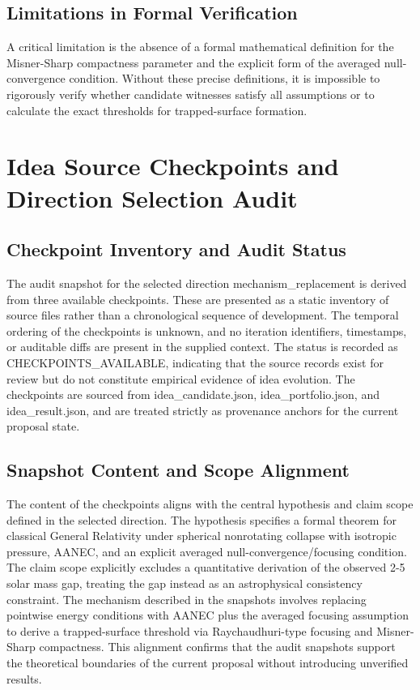 \documentclass[conference]{IEEEtran}
\begin{document}
\subsection{Limitations in Formal Verification}
A critical limitation is the absence of a formal mathematical definition for the Misner-Sharp compactness parameter and the explicit form of the averaged null-convergence condition. Without these precise definitions, it is impossible to rigorously verify whether candidate witnesses satisfy all assumptions or to calculate the exact thresholds for trapped-surface formation.

\appendices
\section{Idea Source Checkpoints and Direction Selection Audit}
\subsection{Checkpoint Inventory and Audit Status}
The audit snapshot for the selected direction mechanism\_replacement is derived from three available checkpoints. These are presented as a static inventory of source files rather than a chronological sequence of development. The temporal ordering of the checkpoints is unknown, and no iteration identifiers, timestamps, or auditable diffs are present in the supplied context. The status is recorded as CHECKPOINTS\_AVAILABLE, indicating that the source records exist for review but do not constitute empirical evidence of idea evolution. The checkpoints are sourced from idea\_candidate.json, idea\_portfolio.json, and idea\_result.json, and are treated strictly as provenance anchors for the current proposal state.

\subsection{Snapshot Content and Scope Alignment}
The content of the checkpoints aligns with the central hypothesis and claim scope defined in the selected direction. The hypothesis specifies a formal theorem for classical General Relativity under spherical nonrotating collapse with isotropic pressure, AANEC, and an explicit averaged null-convergence/focusing condition. The claim scope explicitly excludes a quantitative derivation of the observed 2-5 solar mass gap, treating the gap instead as an astrophysical consistency constraint. The mechanism described in the snapshots involves replacing pointwise energy conditions with AANEC plus the averaged focusing assumption to derive a trapped-surface threshold via Raychaudhuri-type focusing and Misner-Sharp compactness. This alignment confirms that the audit snapshots support the theoretical boundaries of the current proposal without introducing unverified results.
\end{document}
